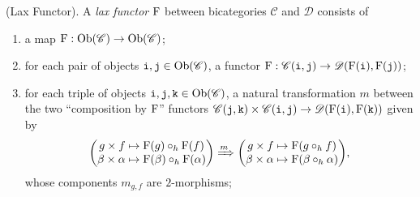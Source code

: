 \noindent\begin{definition} \textup{(Lax Functor).} A {\em lax functor} $\textup{F}$ between bicategories $\mathscr{C}$ and $\mathscr{D}$ consists of
\begin{enumerate}[label=$\bullet$, leftmargin=4\parindent]
\item a map $\textup{F} : \textup{Ob}(\mathscr{C}) \to \textup{Ob}(\mathscr{C})$;
\item for each pair of objects $\textup{\texttt{i}}, \textup{\texttt{j}} \in \textup{Ob}(\mathscr{C})$, a functor $\textup{F} : \mathscr{C}(\textup{\texttt{i}}, \textup{\texttt{j}}) \to \mathscr{D}(\textup{F}(\textup{\texttt{i}}), \textup{F}(\textup{\texttt{j}}))$;
\item for each triple of objects $\textup{\texttt{i}}, \textup{\texttt{j}}, \textup{\texttt{k}} \in \textup{Ob}(\mathscr{C})$, a natural transformation $m$ between the two ``composition by $\textup{F}$'' functors $\mathscr{C}(\textup{\texttt{j}}, \textup{\texttt{k}}) \times \mathscr{C}(\textup{\texttt{i}}, \textup{\texttt{j}}) \to \mathscr{D}(\textup{F}(\textup{\texttt{i}}), \textup{F}(\textup{\texttt{k}}))$ given by
\begin{align*}
\begin{split}
\begin{pmatrix}g \times f \mapsto \textup{F}(g) \circ_h \textup{F}(f)\\\beta \times \alpha \mapsto \textup{F}(\beta) \circ_h \textup{F}(\alpha)\end{pmatrix} \xRightarrow{m} \begin{pmatrix}g \times f \mapsto \textup{F}(g \circ_h f)\\\beta \times \alpha \mapsto \textup{F}(\beta \circ_h \alpha)\end{pmatrix}\!, %
\end{split}
\end{align*}
whose components $m_{g, f}$ are $2$-morphisms;

\end{enumerate}
\end{definition}
